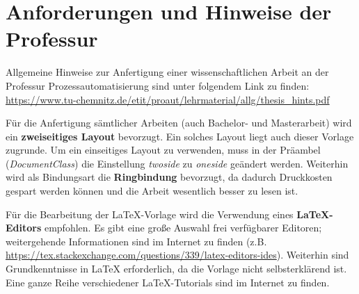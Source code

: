 \chapter{Anforderungen und Hinweise der Professur}
Allgemeine Hinweise zur Anfertigung einer wissenschaftlichen Arbeit an der Professur Prozessautomatisierung sind unter folgendem Link zu finden: \url{https://www.tu-chemnitz.de/etit/proaut/lehrmaterial/allg/thesis_hints.pdf}

Für die Anfertigung sämtlicher Arbeiten (auch Bachelor- und Masterarbeit) wird ein \textbf{zweiseitiges Layout} bevorzugt. Ein solches Layout liegt auch dieser Vorlage zugrunde. Um ein einseitiges Layout zu verwenden, muss in der Präambel (\textit{DocumentClass}) die Einstellung \textit{twoside} zu \textit{oneside} geändert werden. Weiterhin wird als Bindungsart die \textbf{Ringbindung} bevorzugt, da dadurch Druckkosten gespart werden können und die Arbeit wesentlich besser zu lesen ist.

Für die Bearbeitung der \LaTeX-Vorlage wird die Verwendung eines \textbf{\LaTeX-Editors} empfohlen. Es gibt eine große Auswahl frei verfügbarer Editoren; weitergehende Informationen sind im Internet zu finden (z.B. \url{https://tex.stackexchange.com/questions/339/latex-editors-ides}). Weiterhin sind Grundkenntnisse in \LaTeX{} erforderlich, da die Vorlage nicht selbsterklärend ist. Eine ganze Reihe verschiedener \LaTeX-Tutorials sind im Internet zu finden.


